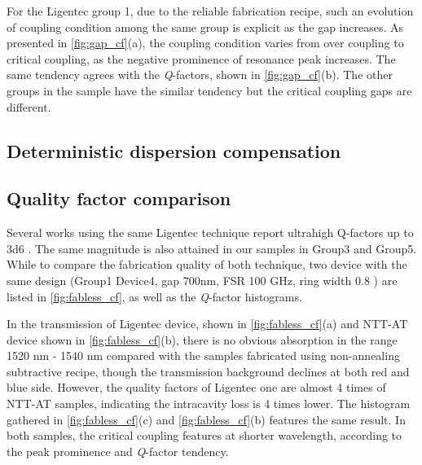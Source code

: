 For the Ligentec group 1, due to the reliable fabrication recipe, such an evolution of coupling condition among the same group is explicit as the gap increases.
As presented in \autoref{fig:gap_cf}(a), the coupling condition varies from over coupling to critical coupling, as the negative prominence of resonance peak increases. The same tendency agrees with the \textit{Q}-factors, shown in \autoref{fig:gap_cf}(b). The other groups in the sample have the similar tendency but the critical coupling gaps are different.

\begin{figure}
	\centering
	
	\label{fig:gap_cf}
\end{figure}

\subsection{Deterministic dispersion compensation}

\begin{figure}
	\centering
	
	\mycaption{}{}
	\label{fig:dint_comp}
\end{figure}


\subsection{Quality factor comparison}


Several works using the same Ligentec technique report ultrahigh Q-factors up to \num{3d6} \cites{Yu2019, Vaidya2019}. The same magnitude is also attained in our samples in Group3 and Group5. While to compare the fabrication quality of both technique, two device with the same design (Group1 Device4, gap 700nm, FSR 100 GHz, ring width 0.8 \um ) are listed in \autoref{fig:fabless_cf}, as well as the \textit{Q}-factor histograms.

\begin{figure}
	\centering
	
	\label{fig:fabless_cf}
\end{figure}

In the transmission of Ligentec device, shown in \autoref{fig:fabless_cf}(a)  and NTT-AT device shown in \autoref{fig:fabless_cf}(b), there is no obvious absorption in the range 1520 nm - 1540 nm compared with the samples fabricated using non-annealing subtractive recipe, though the transmission background declines at both red and blue side. However, the quality factors of Ligentec one are almost 4 times of NTT-AT samples, indicating the intracavity loss is 4 times lower. The histogram gathered in \autoref{fig:fabless_cf}(c) and \autoref{fig:fabless_cf}(b) features the same result.
In both samples, the critical coupling features at shorter wavelength, according to the peak prominence and \textit{Q}-factor tendency. 

